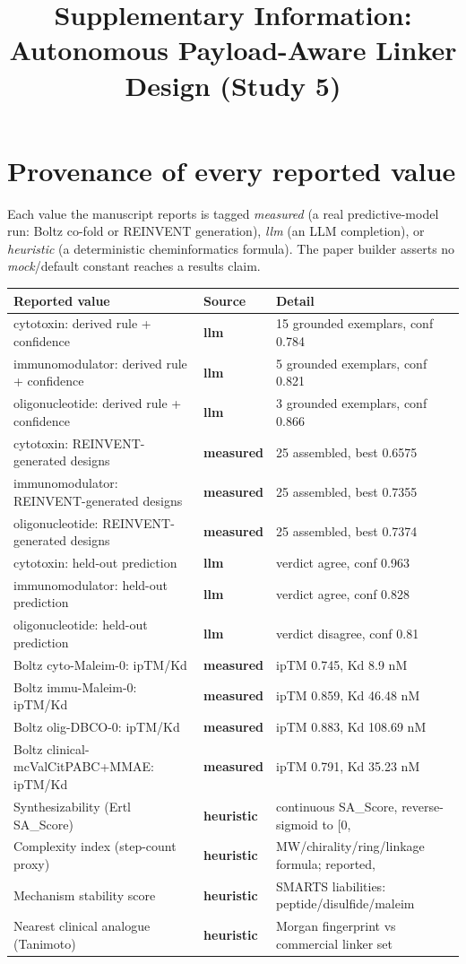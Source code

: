 \documentclass[10pt]{article}
\title{\textbf{Supplementary Information: Autonomous Payload-Aware Linker Design (Study 5)}}
\author{}
\date{}
\begin{document}
\maketitle
\section{Provenance of every reported value}
Each value the manuscript reports is tagged \emph{measured} (a real predictive-model run: Boltz co-fold or REINVENT generation), \emph{llm} (an LLM completion), or \emph{heuristic} (a deterministic cheminformatics formula). The paper builder asserts no \emph{mock}/default constant reaches a results claim.

\begin{table}[h]\centering\scriptsize\begin{tabular}{l l l}\toprule Reported value & Source & Detail \\ \midrule cytotoxin: derived rule + confidence & \textbf{llm} & 15 grounded exemplars, conf 0.784 \\
immunomodulator: derived rule + confidence & \textbf{llm} & 5 grounded exemplars, conf 0.821 \\
oligonucleotide: derived rule + confidence & \textbf{llm} & 3 grounded exemplars, conf 0.866 \\
cytotoxin: REINVENT-generated designs & \textbf{measured} & 25 assembled, best 0.6575 \\
immunomodulator: REINVENT-generated designs & \textbf{measured} & 25 assembled, best 0.7355 \\
oligonucleotide: REINVENT-generated designs & \textbf{measured} & 25 assembled, best 0.7374 \\
cytotoxin: held-out prediction & \textbf{llm} & verdict agree, conf 0.963 \\
immunomodulator: held-out prediction & \textbf{llm} & verdict agree, conf 0.828 \\
oligonucleotide: held-out prediction & \textbf{llm} & verdict disagree, conf 0.81 \\
Boltz cyto-Maleim-0: ipTM/Kd & \textbf{measured} & ipTM 0.745, Kd 8.9 nM \\
Boltz immu-Maleim-0: ipTM/Kd & \textbf{measured} & ipTM 0.859, Kd 46.48 nM \\
Boltz olig-DBCO-0: ipTM/Kd & \textbf{measured} & ipTM 0.883, Kd 108.69 nM \\
Boltz clinical-mcValCitPABC+MMAE: ipTM/Kd & \textbf{measured} & ipTM 0.791, Kd 35.23 nM \\
Synthesizability (Ertl SA\_Score) & \textbf{heuristic} & continuous SA\_Score, reverse-sigmoid to [0, \\
Complexity index (step-count proxy) & \textbf{heuristic} & MW/chirality/ring/linkage formula; reported, \\
Mechanism stability score & \textbf{heuristic} & SMARTS liabilities: peptide/disulfide/maleim \\
Nearest clinical analogue (Tanimoto) & \textbf{heuristic} & Morgan fingerprint vs commercial linker set \\ \bottomrule\end{tabular}\end{table}
\end{document}
